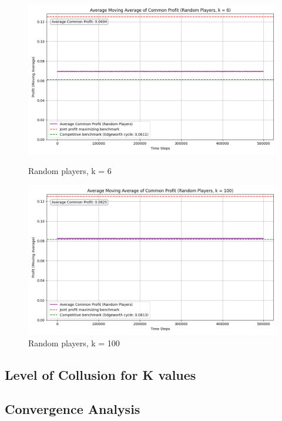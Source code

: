 \documentclass{article}
\begin{document}
\begin{figure}[H]
    \centering
    \begin{minipage}{0.75\linewidth}
        \centering
        \includegraphics[width=\linewidth]{RANDOM PLAYER, K=6.png}
        \caption{Random players, k = 6 }
        \label{fig: RANDOM K = 6}
    \end{minipage}
    \hfill
    \begin{minipage}{0.75\linewidth}
        \centering
        \includegraphics[width=\linewidth]{RANDOM PLAYER, K=100.png}
        \caption{Random players, k = 100}
        \label{fig: RANDOM K = 100}
    \end{minipage}
\end{figure}


\subsection{Level of Collusion for K values}
\label{Level of Collusion for K values}
\subsection{Convergence Analysis}
\label{Convergence Analysis}
\end{document}
